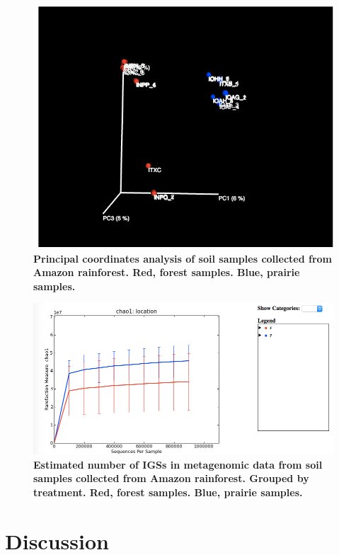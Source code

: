 \documentclass{article}
\begin{document}
\begin{figure}[!ht]
 \centerline{\includegraphics[width=6in]{./figures/IGS_ARMO_beta.png}}
\caption{\bf Principal coordinates analysis of soil samples collected from
Amazon rainforest. Red, forest samples. Blue, prairie
samples.}
\label{fig:ARMO_beta}
\end{figure}

\begin{figure}[!ht]
 \centerline{\includegraphics[width=6in]{./figures/IGS_ARMO_alpha.png}}
\caption{\bf Estimated number of IGSs in metagenomic data from soil samples
collected from Amazon rainforest. Grouped by treatment. Red, forest samples. Blue, prairie
samples.}

\label{fig:ARMO_alpha}
\end{figure}




\section{Discussion}
\end{document}
